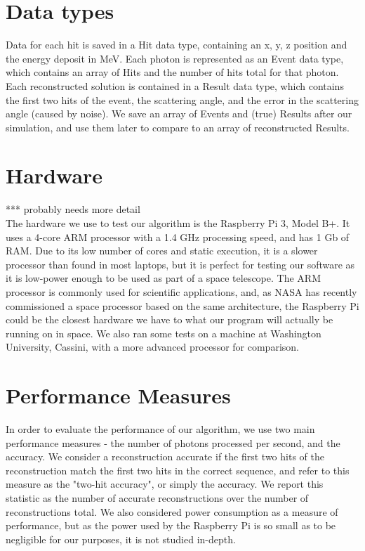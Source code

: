 \section{Data types}
Data for each hit is saved in a Hit data type, containing an x, y, z position and the energy deposit in MeV. Each photon is represented as an Event data type, which contains an array of Hits and the number of hits total for that photon. Each reconstructed solution is contained in a Result data type, which contains the first two hits of the event, the scattering angle, and the error in the scattering angle (caused by noise). We save an array of Events and (true) Results after our simulation, and use them later to compare to an array of reconstructed Results.

\section{Hardware} *** probably needs more detail\\
The hardware we use to test our algorithm is the Raspberry Pi 3, Model B+. It uses a 4-core ARM processor with a 1.4 GHz processing speed, and has 1 Gb of RAM. Due to its low number of cores and static execution, it is a slower processor than found in most laptops, but it is perfect for testing our software as it is low-power enough to be used as part of a space telescope. The ARM processor is commonly used for scientific applications, and, as NASA has recently commissioned a space processor based on the same architecture, the Raspberry Pi could be the closest hardware we have to what our program will actually be running on in space. We also ran some tests on a machine at Washington University, Cassini, with a more advanced processor for comparison.

\section{Performance Measures}
In order to evaluate the performance of our algorithm, we use two main performance measures - the number of photons processed per second, and the accuracy. We consider a reconstruction accurate if the first two hits of the reconstruction match the first two hits in the correct sequence, and refer to this measure as the "two-hit accuracy", or simply the accuracy. We report this statistic as the number of accurate reconstructions over the number of reconstructions total. We also considered power consumption as a measure of performance, but as the power used by the Raspberry Pi is so small as to be negligible for our purposes, it is not studied in-depth.

